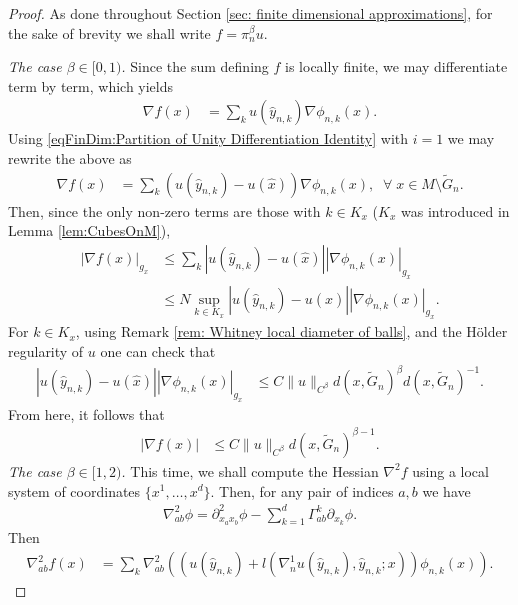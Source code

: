 \documentclass[11pt,reqno]{amsart}
\numberwithin{equation}{section}
\theoremstyle{plain}
\begin{document}
\begin{proof}
  As done throughout Section \ref{sec: finite dimensional approximations}, for the sake of brevity we shall write $f=\pi_n^\beta u$.
  
  \emph{The case $\beta \in [0,1)$.} Since the sum defining $f$ is locally finite, we may differentiate term by term, which yields
  \begin{align*}
    \nabla f(x) & = \sum \limits_{k} u(\hat y_{n,k})\nabla \phi_{n,k}(x).
  \end{align*}
  Using \eqref{eqFinDim:Partition of Unity Differentiation Identity} with $i=1$ we may rewrite the above as
  \begin{align*}
    \nabla f(x) & = \sum \limits_{k}(u(\hat y_{n,k})-u(\hat x))\nabla \phi_{n,k}(x),\;\;\forall\;x\in M \setminus \tilde G_n.
  \end{align*}
  Then, since the only non-zero terms are those with $k \in K_x$ ($K_x$ was introduced in Lemma \ref{lem:CubesOnM}), 
  \begin{align*}	  
    |\nabla f(x)|_{g_x} & \leq \sum \limits_{k}|u(\hat y_{n,k})-u(\hat x)| |\nabla \phi_{n,k}(x)|_{g_x}\\
	& \leq N \sup\limits_{k \in K_x}|u(\hat y_{n,k})-u(\hat x)||\nabla \phi_{n,k}(x)|_{g_x}.
  \end{align*}
  For $k\in K_x$, using Remark \ref{rem: Whitney local diameter of balls}, and the H\"older regularity of $u$ one can check that
  \begin{align*}
    |u(\hat y_{n,k})-u(\hat x)| |\nabla \phi_{n,k}(x)|_{g_x} & \leq  C\|u\|_{C^\beta}d(x,\tilde G_n)^\beta d(x,\tilde G_n)^{-1}.
  \end{align*}
  From here, it follows that
  \begin{align*}
    |\nabla f(x)| & \leq C\|u\|_{C^\beta}d(x,\tilde G_n)^{\beta-1}.
  \end{align*}
  \emph{The case $\beta\in [1,2)$.} This time, we shall compute the Hessian $\nabla^2f$ using a local system of coordinates $\{x^{1},\ldots,x^{d}\}$. Then, for any pair of indices $a,b$ we have
  \begin{align*}
    \nabla^2_{ab}\phi = \partial_{x_ax_b}^2\phi- \sum \limits_{k=1}^d\Gamma_{ab}^k\partial_{x_k}\phi.
  \end{align*}
  Then
  \begin{align*}
    \nabla^2_{ab} f(x) & = \sum \limits_{k} \nabla^2_{ab}\left ( (u(\hat y_{n,k})+l( \nabla^1_n u (\hat y_{n,k}),\hat y_{n,k};x)) \phi_{n,k}(x) \right ).
  \end{align*}		

\end{proof}
\end{document}
